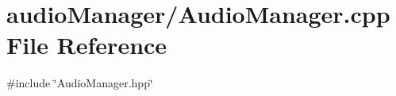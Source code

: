 \section{audio\+Manager/\+Audio\+Manager.cpp File Reference}
\label{_audio_manager_8cpp}
{\ttfamily \#include \char`\"{}Audio\+Manager.\+hpp\char`\"{}}\newline
